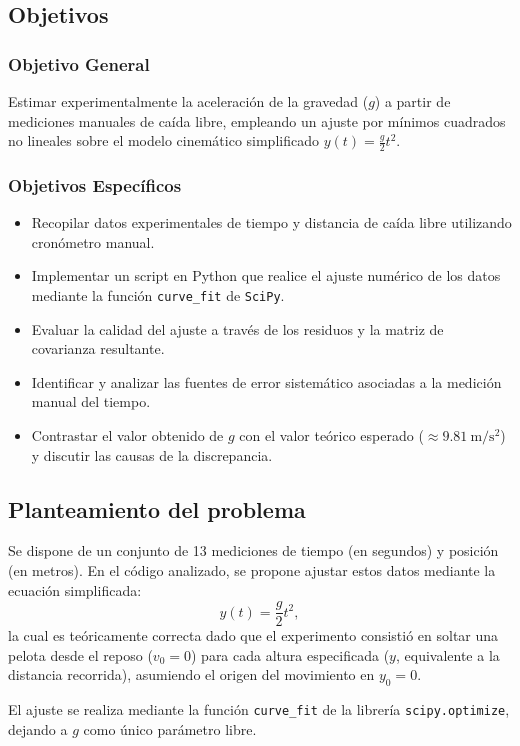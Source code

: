 \documentclass[12pt,a4paper]{article}
\begin{document}
\subsection{Objetivos}

\subsubsection{Objetivo General}
Estimar experimentalmente la aceleración de la gravedad ($g$) a partir de mediciones manuales de caída libre, empleando un ajuste por mínimos cuadrados no lineales sobre el modelo cinemático simplificado $y(t) = \frac{g}{2}t^2$.

\subsubsection{Objetivos Específicos}
\begin{itemize}
    \item Recopilar datos experimentales de tiempo y distancia de caída libre utilizando cronómetro manual.
    \item Implementar un script en Python que realice el ajuste numérico de los datos mediante la función \texttt{curve\_fit} de \texttt{SciPy}.
    \item Evaluar la calidad del ajuste a través de los residuos y la matriz de covarianza resultante.
    \item Identificar y analizar las fuentes de error sistemático asociadas a la medición manual del tiempo.
    \item Contrastar el valor obtenido de $g$ con el valor teórico esperado ($\approx 9.81\ \mathrm{m/s^2}$) y discutir las causas de la discrepancia.
\end{itemize}

\subsection{Planteamiento del problema}
Se dispone de un conjunto de 13 mediciones de tiempo (en segundos) y posición (en metros). En el código analizado, se propone ajustar estos datos mediante la ecuación simplificada:
$$y(t)=\frac{g}{2}t^2,$$
la cual es teóricamente correcta dado que el experimento consistió en soltar una pelota desde el reposo ($v_0=0$) para cada altura especificada ($y$, equivalente a la distancia recorrida), asumiendo el origen del movimiento en $y_0=0$. 

El ajuste se realiza mediante la función \texttt{curve\_fit} de la librería \texttt{scipy.optimize}, dejando a $g$ como único parámetro libre. 
\end{document}
